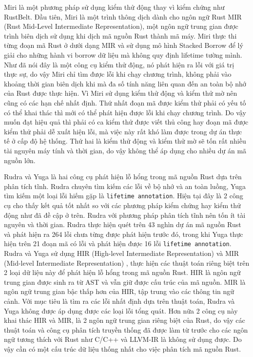 Miri là một phương pháp sử dụng kiểm thử động thay vì kiểm chứng như RustBelt.
Đầu tiên, Miri là một trình thông dịch dành cho ngôn ngữ Rust MIR (Rust Mid-Level Intermediate Representation), một ngôn ngữ trung gian được trình biên dịch sử dụng khi dịch mã nguồn Rust thành mã máy.
Miri thực thi từng đoạn mã Rust ở dưới dạng MIR và sử dụng mô hình Stacked Borrow \cite{jung2019stacked} để lý giải cho những hành vi borrow dữ liệu mà không quy định lifetime tường mình.
Như đã nói đây là một công cụ kiểm thử động, nó phát hiện ra lỗi với giá trị thực sự, do vậy Miri chỉ tìm được lỗi khi chạy chương trình, không phải vào khoảng thời gian biên dịch khi mà đa số tính năng liên quan đến an toàn bộ nhớ của Rust được thực hiện.
Vì Miri sử dụng kiểm thử động và kiểm thử mờ nên cũng có các hạn chế nhất định.
Thứ nhất đoạn mã được kiểm thử phải có yếu tố có thể khai thác thì mới có thể phát hiện được lỗi khi chạy chương trình.
Do vậy muốn đạt hiệu quả thì phải có ca kiểm thử được viết thủ công hay đoạn mã được kiểm thử phải dễ xuất hiện lỗi, mà việc này rất khó làm được trong dự án thực tế ở cấp độ hệ thống.
Thứ hai là kiểm thử động và kiểm thử mờ sẽ tốn rất nhiều tài nguyên máy tính và thời gian, do vậy không thể áp dụng cho nhiều dự án mã nguồn lớn.

Rudra và Yuga là hai công cụ phát hiện lỗ hổng trong mã nguồn Rust dựa trên phân tích tĩnh.
Rudra chuyên tìm kiếm các lỗi về bộ nhớ và an toàn luồng, Yuga tìm kiếm một loại lỗi hiếm gặp là \texttt{lifetime annotation}.
Hiện tại đây là 2 công cụ cho thấy kết quả tốt nhất so với các phương pháp kiểm chứng hay kiểm thử động như đã đề cập ở trên.
Rudra với phương pháp phân tích tĩnh nên tốn ít tài nguyên và thời gian. Rudra thực hiện quét trên 43 nghìn dự án mã nguồn Rust và phát hiện ra 264 lỗi chưa từng được phát hiện trước đó, trong khi Yuga thực hiện trên 21 đoạn mã có lỗi và phát hiện được 16 lỗi \texttt{lifetime annotation}.
Rudra và Yuga sử dụng HIR (High-level Intermediate Representation) \cite{rustlangHighlevelRust} và MIR (Mid-level Intermediate Representation) \cite{rustlangMidlevelRust}, thực hiện các thuật toán riêng biệt trên 2 loại dữ liệu này để phát hiện lỗ hổng trong mã nguồn Rust.
HIR là ngôn ngữ trung gian được sinh ra từ AST và vẫn giữ được cấu trúc của mã nguồn.
MIR là ngôn ngữ trung gian bậc thấp hơn của HIR, tập trung vào các thông tin ngữ cảnh.
Với mục tiêu là tìm ra các lỗi nhất định dựa trên thuật toán, Rudra và Yuga không được áp dụng được các loại lỗi tổng quát.
Hơn nữa 2 công cụ này khai thác HIR và MIR, là 2 ngôn ngữ trung gian riêng biệt của Rust, do vậy các thuật toán và công cụ phân tích truyền thống đã được làm từ trước cho các ngôn ngữ tương thích với Rust như C/C++ và LLVM-IR là không sử dụng được.
Do vậy cần có một cấu trúc dữ liệu thống nhất cho việc phân tích mã nguồn Rust.

